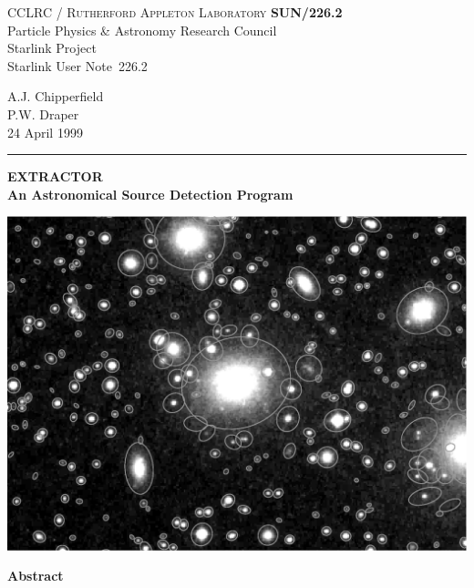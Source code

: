 \documentclass[twoside,11pt]{article}
\newcommand{\stardoccategory}  {Starlink User Note}
\newcommand{\stardocinitials}  {SUN}
\newcommand{\stardocnumber}    {226.2}
\newcommand{\stardocauthors}   {A.J. Chipperfield\\
                                P.W. Draper}
\newcommand{\stardocdate}      {24 April 1999}
\newcommand{\stardoctitle}     {EXTRACTOR\\
                                An Astronomical Source Detection Program}
\newcommand{\stardocname}{\stardocinitials /\stardocnumber}
\newenvironment{latexonly}{}{}
\renewcommand{\_}{\texttt{\symbol{95}}}
\begin{document}
\thispagestyle{empty}

\begin{latexonly}
   CCLRC / \textsc{Rutherford Appleton Laboratory} \hfill \textbf{\stardocname}\\
   {\large Particle Physics \& Astronomy Research Council}\\
   {\large Starlink Project\\}
   {\large \stardoccategory\ \stardocnumber}
   \begin{flushright}
   \stardocauthors\\
   \stardocdate
   \end{flushright}
   \vspace{-4mm}
   \rule{\textwidth}{0.5mm}
   \vspace{4mm}
   \begin{center}
   {\LARGE\textbf{\stardoctitle} \\ [2.5ex]}
   \vspace{4mm}

   \includegraphics[scale=0.6]{sun226fig.ps}
   \end{center}

   \vspace{5mm}
   \begin{center}
      {\Large\textbf{Abstract}}
   \end{center}
\end{latexonly}
\end{document}
